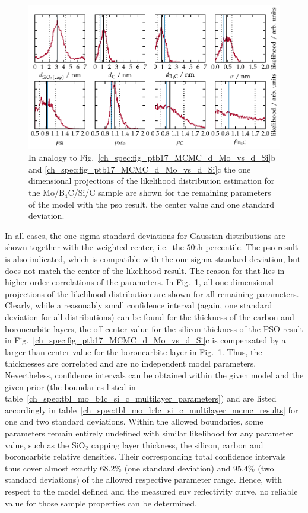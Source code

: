 \begin{figure}[htbp]
\centering
\includegraphics{img/PTB17_MCMC_other_params}
\caption[Results of the maximum likelihood estimation for the remaining model parameters of the Mo/B$_4$C/Si/C sample.]{In analogy to Fig.~\ref{ch_spec:fig_ptb17_MCMC_d_Mo_vs_d_Si}b and \ref{ch_spec:fig_ptb17_MCMC_d_Mo_vs_d_Si}c the one dimensional projections of the likelihood distribution estimation for the Mo/B$_4$C/Si/C sample are shown for the remaining parameters of the model with the \gls{pso} result, the center value and one standard deviation.}
\label{ch_spec:fig_ptb17_MCMC_other_params}
\end{figure}
In all cases, the one-sigma standard deviations for Gaussian distributions are shown together with the weighted center, i.e.~the $50$th percentile. The \gls{pso} result is also indicated, which is compatible with the one sigma standard deviation, but does not match the center of the likelihood result. The reason for that lies in higher order correlations of the parameters. In Fig.~\ref{ch_spec:fig_ptb17_MCMC_other_params}, all one-dimensional projections of the likelihood distribution are shown for all remaining parameters. Clearly, while a reasonably small confidence interval (again, one standard deviation for all distributions) can be found for the thickness of the carbon and boroncarbite layers, the off-center value for the silicon thickness of the PSO result in Fig.~\ref{ch_spec:fig_ptb17_MCMC_d_Mo_vs_d_Si}c is compensated by a larger than center value for the boroncarbite layer in Fig.~\ref{ch_spec:fig_ptb17_MCMC_other_params}. Thus, the thicknesses are correlated and are no independent model parameters. Nevertheless, confidence intervals can be obtained within the given model and the given prior (the boundaries listed in table~\ref{ch_spec:tbl_mo_b4c_si_c_multilayer_parameters}) and are listed accordingly in table~\ref{ch_spec:tbl_mo_b4c_si_c_multilayer_mcmc_results} for one and two standard deviations. Within the allowed boundaries, some parameters remain entirely undefined with similar likelihood for any parameter value, such as the SiO$_2$ capping layer thickness, the silicon, carbon and boroncarbite relative densities. Their corresponding total confidence intervals thus cover almost exactly $68.2\%$ (one standard deviation) and $95.4\%$ (two standard deviations) of the allowed respective parameter range. Hence, with respect to the model defined and the measured \gls{euv} reflectivity curve, no reliable value for those sample properties can be determined.
